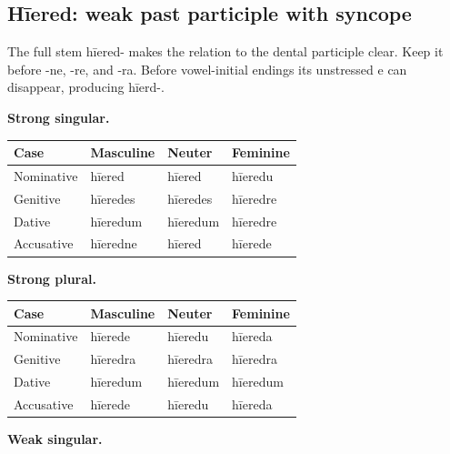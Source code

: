 \subsection*{Hīered: weak past participle with syncope}

The full stem hīered- makes the relation to the dental participle clear. Keep it before -ne, -re, and -ra. Before vowel-initial endings its unstressed e can disappear, producing hīerd-.

\textbf{Strong singular.}

\par\begingroup
\fontsize{10.5}{13.2}\selectfont
\setlength{\LTleft}{0pt}\setlength{\LTright}{\fill}
\noindent
\begin{tabular}{@{}>{\raggedright\arraybackslash}p{22.0mm}>{\raggedright\arraybackslash}p{31.188mm}>{\raggedright\arraybackslash}p{31.188mm}>{\raggedright\arraybackslash}p{31.188mm}@{}}
\toprule
\textbf{Case} & \textbf{Masculine} & \textbf{Neuter} & \textbf{Feminine} \\
\midrule
Nominative & hīered & hīered & hīeredu \\
Genitive & hīeredes & hīeredes & hīeredre \\
Dative & hīeredum & hīeredum & hīeredre \\
Accusative & hīeredne & hīered & hīerede \\
\bottomrule
\end{tabular}
\par\endgroup
\textbf{Strong plural.}

\par\begingroup
\fontsize{10.5}{13.2}\selectfont
\setlength{\LTleft}{0pt}\setlength{\LTright}{\fill}
\noindent
\begin{tabular}{@{}>{\raggedright\arraybackslash}p{22.0mm}>{\raggedright\arraybackslash}p{31.188mm}>{\raggedright\arraybackslash}p{31.188mm}>{\raggedright\arraybackslash}p{31.188mm}@{}}
\toprule
\textbf{Case} & \textbf{Masculine} & \textbf{Neuter} & \textbf{Feminine} \\
\midrule
Nominative & hīerede & hīeredu & hīereda \\
Genitive & hīeredra & hīeredra & hīeredra \\
Dative & hīeredum & hīeredum & hīeredum \\
Accusative & hīerede & hīeredu & hīereda \\
\bottomrule
\end{tabular}
\par\endgroup
\textbf{Weak singular.}

